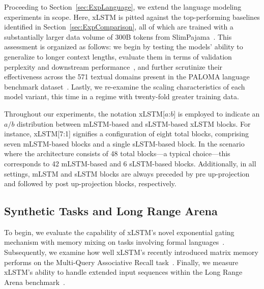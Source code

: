 Proceeding to Section~\ref{sec:ExpLanguage}, we extend the language modeling experiments in scope. Here, xLSTM is pitted against the top-performing baselines identified in Section~\ref{sec:ExpComparison}, all of which are trained with a substantially larger data volume of 300B tokens from SlimPajama~\citep{Soboleva:23}. This assessment is organized as follows: we begin by testing the models' ability to generalize to longer context lengths, evaluate them in terms of validation perplexity and downstream performance~\citep{Sutawika:24}, and further scrutinize their effectiveness across the 571 textual domains present in the PALOMA language benchmark dataset~\citep{Magnusson:23arxivshort}. Lastly, we re-examine the scaling characteristics of each model variant, this time in a regime with twenty-fold greater training data.

\label{sec:xlstm_blocks_notation}
Throughout our experiments, the notation xLSTM[$a$:$b$] is employed to indicate an $a/b$ distribution between mLSTM-based and sLSTM-based xLSTM blocks. For instance, xLSTM[7:1] signifies a configuration of eight total blocks, comprising seven mLSTM-based blocks and a single sLSTM-based block. In the scenario where the architecture consists of 48 total blocks—a typical choice—this corresponds to 42 mLSTM-based and 6 sLSTM-based blocks. Additionally, in all settings, mLSTM and sLSTM blocks are always preceded by pre up-projection and followed by post up-projection blocks, respectively.

\subsection{Synthetic Tasks and Long Range Arena}
\label{sec:ExpSyntethic}
To begin, we evaluate the capability of xLSTM’s novel exponential gating mechanism with memory mixing on tasks involving formal languages~\citep{Deletang:23}. Subsequently, we examine how well xLSTM’s recently introduced matrix memory performs on the Multi-Query Associative Recall task~\citep{Arora:23arxiv}. Finally, we measure xLSTM’s ability to handle extended input sequences within the Long Range Arena benchmark~\citep{Tay:21}.


